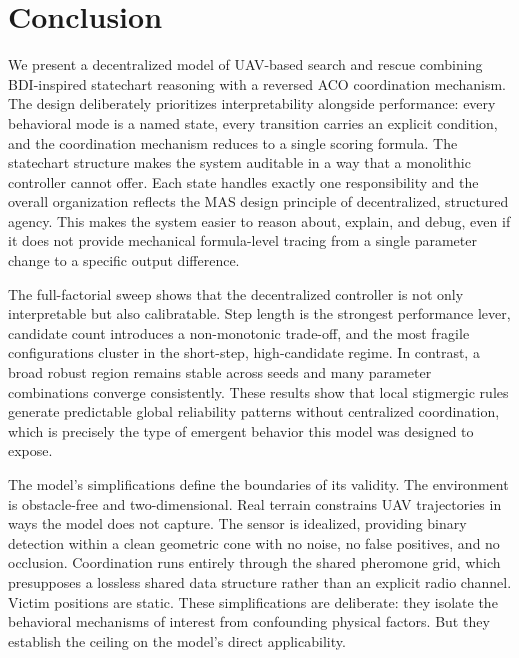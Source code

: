 \section{Conclusion}

We present a decentralized model of UAV-based search and rescue combining BDI-inspired statechart reasoning with a reversed ACO coordination mechanism. The design deliberately prioritizes interpretability alongside performance: every behavioral mode is a named state, every transition carries an explicit condition, and the coordination mechanism reduces to a single scoring formula. The statechart structure makes the system auditable in a way that a monolithic controller cannot offer. Each state handles exactly one responsibility and the overall organization reflects the MAS design principle of decentralized, structured agency. This makes the system easier to reason about, explain, and debug, even if it does not provide mechanical formula-level tracing from a single parameter change to a specific output difference.

The full-factorial sweep shows that the decentralized controller is not only interpretable but also calibratable. Step length is the strongest performance lever, candidate count introduces a non-monotonic trade-off, and the most fragile configurations cluster in the short-step, high-candidate regime. In contrast, a broad robust region remains stable across seeds and many parameter combinations converge consistently. These results show that local stigmergic rules generate predictable global reliability patterns without centralized coordination, which is precisely the type of emergent behavior this model was designed to expose.

\lipsum[7]

The model's simplifications define the boundaries of its validity. The environment is obstacle-free and two-dimensional. Real terrain constrains UAV trajectories in ways the model does not capture. The sensor is idealized, providing binary detection within a clean geometric cone with no noise, no false positives, and no occlusion. Coordination runs entirely through the shared pheromone grid, which presupposes a lossless shared data structure rather than an explicit radio channel. Victim positions are static. These simplifications are deliberate: they isolate the behavioral mechanisms of interest from confounding physical factors. But they establish the ceiling on the model's direct applicability.

